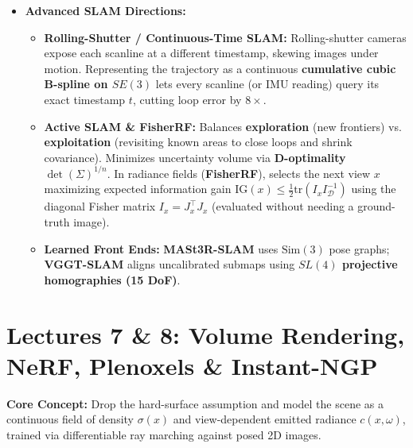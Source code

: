 \documentclass[11pt,a4paper]{article}
\theoremstyle{definition}
\theoremstyle{plain}
\theoremstyle{remark}
\begin{document}
\begin{itemize}
\begin{itemize}
        \item \textbf{Thread 2 --- Local Mapping (per keyframe):} Updates the \textbf{Covisibility Graph} (edges between keyframes sharing $\ge 15$ points), triangulates new points, runs \textbf{Local BA} on the covisible neighborhood (keeping outer keyframes fixed), and culls redundant keyframes (where $\ge 90\%$ of points are seen by $\ge 3$ other keyframes).
        \item \textbf{Thread 3 --- Loop Closing \& Relocalization:} Queries a hierarchical \textbf{Bag of Binary Words (DBoW2)} vocabulary tree ($k$ branches, $L$ levels $\Rightarrow k^L$ words in only $kL$ comparisons) with an \textbf{inverted index}. Because monocular SLAM has \textbf{7-DoF drift} (rotation, translation, \emph{and scale}), loop correction optimizes the Essential Graph over \textbf{$\text{Sim}(3)$ similarity transforms} ($e_{ij} = \log(Z_{ij}^{-1} S_i S_j^{-1})^\vee \in \mathbb{R}^7$) rather than $SE(3)$.
    \end{itemize}
    \item \textbf{Advanced SLAM Directions:}
    \begin{itemize}
        \item \textbf{Rolling-Shutter / Continuous-Time SLAM:} Rolling-shutter cameras expose each scanline at a different timestamp, skewing images under motion. Representing the trajectory as a continuous \textbf{cumulative cubic B-spline on $SE(3)$} lets every scanline (or IMU reading) query its exact timestamp $t$, cutting loop error by $8\times$.
        \item \textbf{Active SLAM \& FisherRF:} Balances \textbf{exploration} (new frontiers) vs. \textbf{exploitation} (revisiting known areas to close loops and shrink covariance). Minimizes uncertainty volume via \textbf{D-optimality} $\det(\Sigma)^{1/n}$. In radiance fields (\textbf{FisherRF}), selects the next view $x$ maximizing expected information gain $\text{IG}(x) \le \frac{1}{2}\text{tr}(I_x I_{\mathcal{D}}^{-1})$ using the diagonal Fisher matrix $I_x = J_x^\top J_x$ (evaluated without needing a ground-truth image).
        \item \textbf{Learned Front Ends:} \textbf{MASt3R-SLAM} uses $\text{Sim}(3)$ pose graphs; \textbf{VGGT-SLAM} aligns uncalibrated submaps using \textbf{$SL(4)$ projective homographies (15 DoF)}.
    \end{itemize}
\end{itemize}

\hr
\section*{\textcolor{primary}{Lectures 7 \& 8: Volume Rendering, NeRF, Plenoxels \& Instant-NGP}}
\textbf{Core Concept:} Drop the hard-surface assumption and model the scene as a continuous field of density $\sigma(x)$ and view-dependent emitted radiance $c(x, \omega)$, trained via differentiable ray marching against posed 2D images.
\end{document}
